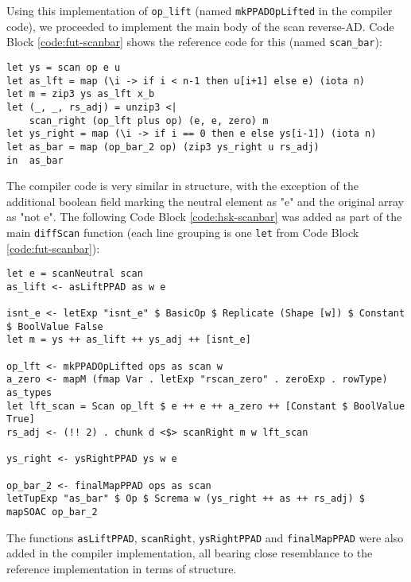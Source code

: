 \documentclass{article}
\newenvironment{code}{\captionsetup{type=listing}}{}
\begin{document}
Using this implementation of \lstinline{op_lift} (named \lstinline{mkPPADOpLifted} in the compiler code), we proceeded to implement the main body of the scan reverse-AD. Code Block \ref{code:fut-scanbar} shows the reference code for this (named \lstinline{scan_bar}):
\newpage
\begin{code}
\begin{verbatim}
let ys = scan op e u
let as_lft = map (\i -> if i < n-1 then u[i+1] else e) (iota n)
let m = zip3 ys as_lft x_b
let (_, _, rs_adj) = unzip3 <|
    scan_right (op_lft plus op) (e, e, zero) m
let ys_right = map (\i -> if i == 0 then e else ys[i-1]) (iota n)
let as_bar = map (op_bar_2 op) (zip3 ys_right u rs_adj)
in  as_bar
\end{verbatim}
\caption{Reference Futhark code for \lstinline{scan_bar} (main reverse AD fuction).}
\label{code:fut-scanbar}
\end{code}
\vspace{0.3cm}
The compiler code is very similar in structure, with the exception of the additional boolean field marking the neutral element as "e" and the original array as "not e". The following Code Block \ref{code:hsk-scanbar} was added as part of the main \lstinline{diffScan} function (each line grouping is one \lstinline{let} from Code Block \ref{code:fut-scanbar}):
\begin{code}
	\begin{verbatim}
let e = scanNeutral scan
as_lift <- asLiftPPAD as w e

isnt_e <- letExp "isnt_e" $ BasicOp $ Replicate (Shape [w]) $ Constant $ BoolValue False
let m = ys ++ as_lift ++ ys_adj ++ [isnt_e]

op_lft <- mkPPADOpLifted ops as scan w
a_zero <- mapM (fmap Var . letExp "rscan_zero" . zeroExp . rowType) as_types
let lft_scan = Scan op_lft $ e ++ e ++ a_zero ++ [Constant $ BoolValue True]
rs_adj <- (!! 2) . chunk d <$> scanRight m w lft_scan

ys_right <- ysRightPPAD ys w e

op_bar_2 <- finalMapPPAD ops as scan
letTupExp "as_bar" $ Op $ Screma w (ys_right ++ as ++ rs_adj) $ mapSOAC op_bar_2
\end{verbatim}
\caption{Haskell code for \lstinline{scan_bar} (main reverse AD fuction). \lstinline{w} is the length of the arrays in \lstinline{as}.\\}
\label{code:hsk-scanbar}
\end{code}
\vspace{0.3cm}
The functions \lstinline{asLiftPPAD}, \lstinline{scanRight}, \lstinline{ysRightPPAD} and \lstinline{finalMapPPAD} were also added in the compiler implementation, all bearing close resemblance to the reference implementation in terms of structure.
\end{document}
